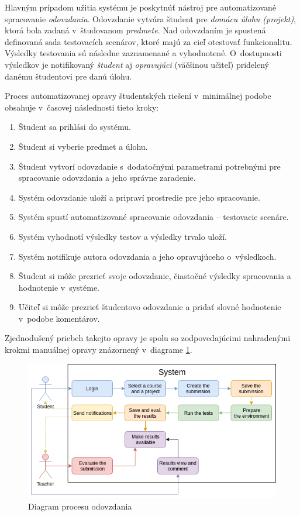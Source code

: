 \documentclass[
  digital, %
  oneside, %
  table,   %
  lof,     %
  lot,   %
]{fithesis3}
\begin{document}
Hlavným prípadom užitia systému je poskytnúť nástroj pre automatizované spracovanie \emph{odovzdania}. Odovzdanie vytvára študent pre \emph{domácu úlohu (projekt)}, ktorá bola zadaná v~študovanom \emph{predmete}. Nad odovzdaním je spustená definovaná sada testovacích scenárov, ktoré majú za cieľ otestovať funkcionalitu. Výsledky testovania sú následne zaznamenané a vyhodnotené. O~dostupnosti výsledkov je notifikovaný \emph{študent} aj \emph{opravujúci} (väčšinou učiteľ) pridelený danému študentovi pre danú úlohu.

Proces automatizovanej opravy študentských riešení v~minimálnej podobe obsahuje v~časovej následnosti tieto kroky:
\begin{enumerate}
    \item Študent sa prihlási do systému.
    \item Študent si vyberie predmet a úlohu.
    \item Študent vytvorí odovzdanie s~dodatočnými parametrami potrebnými pre spracovanie odovzdania a jeho správne zaradenie.
    \item Systém odovzdanie uloží a pripraví prostredie pre jeho spracovanie.
    \item Systém spustí automatizované spracovanie odovzdania -- testovacie scenáre.
    \item Systém vyhodnotí výsledky testov a výsledky trvalo uloží.
    \item Systém notifikuje autora odovzdania a jeho opravujúceho o~výsledkoch.
    \item Študent si môže prezrieť svoje odovzdanie, čiastočné výsledky spracovania a hodnotenie v~systéme.
    \item Učiteľ si môže prezrieť študentovo odovzdanie a pridať slovné hodnotenie v~podobe komentárov. 
\end{enumerate}

Zjednodušený priebeh takejto opravy je spolu so zodpovedajúcimi nahradenými krokmi manuálnej opravy znázornený v~diagrame \ref{fig:eval-process}.

\begin{figure}[!ht]
  \begin{center}
    \includegraphics[width=\textwidth]{imgs/eval-process.png}
  \end{center}
    \caption{Diagram procesu odovzdania}
    \label{fig:eval-process}
\end{figure}
\end{document}

